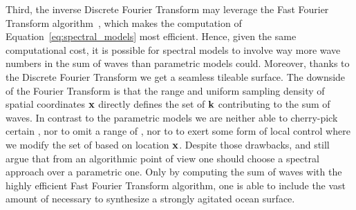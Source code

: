 Third, the inverse Discrete Fourier Transform may leverage the
Fast Fourier Transform algorithm~\citep{Cooley:1965}, which makes the computation of
Equation~\ref{eq:spectral_models} most efficient. Hence, given the same
computational cost, it is possible for spectral models to involve way more wave
numbers in the sum of waves than parametric models could. Moreover, thanks to
the Discrete Fourier Transform we get a seamless tileable surface.
The downside of the Fourier Transform is that the range and uniform sampling
density of spatial coordinates $\mathbf{x}$ directly defines the set of \wavevectors
$\mathbf{k}$ contributing to the sum of waves. In contrast to the
parametric models we are neither able to cherry-pick certain \wavevectors,
nor to omit a range of \wavevectors, nor to to exert some form of local control
where we modify the set of \wavevectors based on location $\mathbf{x}$.
Despite those drawbacks, \citet{Mitchell:2005} and \citet{Thon:2000} still
argue that from an algorithmic point of view one should choose a spectral
approach over a parametric one. Only by computing the sum of waves with the
highly efficient Fast Fourier Transform algorithm, one is able to include the
vast amount of \wavenumbers necessary to synthesize a strongly agitated ocean
surface.
%
